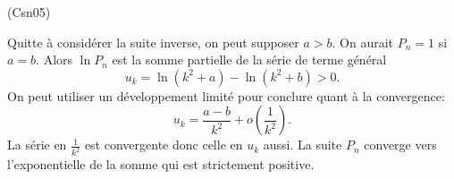 \begin{tiny}(Csn05)\end{tiny} Quitte à considérer la suite inverse, on peut supposer $a>b$. On aurait $P_n =1$ si $a=b$.\newline
Alors $\ln P_n$ est la somme partielle de la série de terme général
\[
 u_k= \ln(k^2 + a) - \ln(k^2 +b) > 0.
\]
On peut utiliser un développement limité pour conclure quant à la convergence:
\[
 u_k = \frac{a-b}{k^2} + o(\frac{1}{k^2}).
\]
La série en $\frac{1}{k^2}$ est convergente donc celle en $u_k$ aussi. La suite $P_n$ converge vers l'exponentielle de la somme qui est strictement positive.